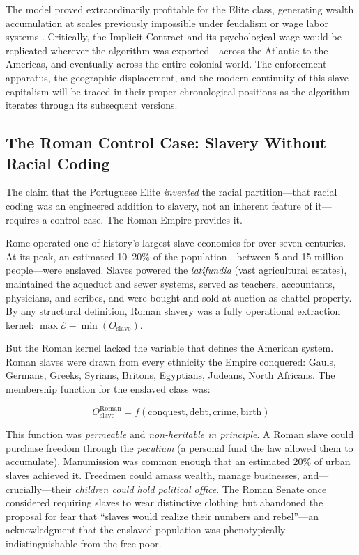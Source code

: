 \documentclass[12pt,openany]{book}
\begin{document}
The model proved extraordinarily profitable for the Elite class, generating wealth accumulation at scales previously impossible under feudalism or wage labor systems \cite{williams, robinson}. Critically, the Implicit Contract and its psychological wage would be replicated wherever the algorithm was exported---across the Atlantic to the Americas, and eventually across the entire colonial world. The enforcement apparatus, the geographic displacement, and the modern continuity of this slave capitalism will be traced in their proper chronological positions as the algorithm iterates through its subsequent versions.

\subsection{The Roman Control Case: Slavery Without Racial Coding}

The claim that the Portuguese Elite \textit{invented} the racial partition---that racial coding was an engineered addition to slavery, not an inherent feature of it---requires a control case. The Roman Empire provides it.

Rome operated one of history's largest slave economies for over seven centuries. At its peak, an estimated 10--20\% of the population---between 5 and 15 million people---were enslaved. Slaves powered the \textit{latifundia} (vast agricultural estates), maintained the aqueduct and sewer systems, served as teachers, accountants, physicians, and scribes, and were bought and sold at auction as chattel property. By any structural definition, Roman slavery was a fully operational extraction kernel: $\max \mathcal{E} - \min(O_{\text{slave}})$.

But the Roman kernel lacked the variable that defines the American system. Roman slaves were drawn from every ethnicity the Empire conquered: Gauls, Germans, Greeks, Syrians, Britons, Egyptians, Judeans, North Africans. The membership function for the enslaved class was:

\[
O_{\text{slave}}^{\text{Roman}} = f(\text{conquest}, \text{debt}, \text{crime}, \text{birth})
\]

This function was \textit{permeable} and \textit{non-heritable in principle}. A Roman slave could purchase freedom through the \textit{peculium} (a personal fund the law allowed them to accumulate). Manumission was common enough that an estimated 20\% of urban slaves achieved it. Freedmen could amass wealth, manage businesses, and---crucially---their \textit{children could hold political office}. The Roman Senate once considered requiring slaves to wear distinctive clothing but abandoned the proposal for fear that ``slaves would realize their numbers and rebel''---an acknowledgment that the enslaved population was phenotypically indistinguishable from the free poor.
\end{document}
